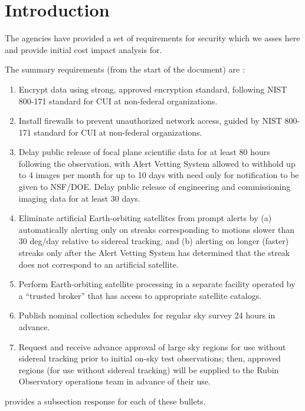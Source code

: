 \section{Introduction}

The agencies have provided a set of requirements for security which we asses here and provide initial cost impact analysis for.

The summary requirements (from the start of the document) are :
\begin{enumerate}

\item	Encrypt data using strong, approved encryption standard, following NIST 800-171 standard for CUI at non-federal organizations.
\item	Install firewalls to prevent unauthorized network access, guided by NIST 800-171 standard for CUI at non-federal organizations.
\item	Delay public release of focal plane scientific data for at least 80 hours following the observation, with Alert Vetting System allowed to withhold up to 4 images per month for up to 10 days with need only for notification to be given to NSF/DOE. Delay public release of engineering and commissioning imaging data for at least 30 days.
\item	Eliminate artificial Earth-orbiting satellites from prompt alerts by (a) automatically alerting only on streaks corresponding to motions slower than 30 deg/day relative to sidereal tracking, and (b) alerting on longer (faster) streaks only after the Alert Vetting System has determined that the streak does not correspond to an artificial satellite.
\item	Perform Earth-orbiting satellite processing in a separate facility operated by a “trusted broker” that has access to appropriate satellite catalogs.
\item	Publish nominal collection schedules for regular sky survey 24 hours in advance.
\item	Request and receive advance approval of large sky regions for use without sidereal tracking prior to initial on-sky test observations; then, approved regions (for use without sidereal tracking) will be supplied to the Rubin Observatory operations team in advance of their use.

\end{enumerate}


 provides a subsection response for each of these bullets.
